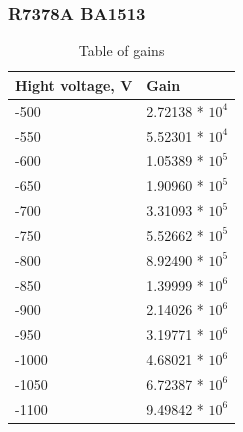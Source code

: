 \documentclass{beamer}
\begin{document}
\begin{frame}
\frametitle{R7378A BA1513}
\begin{table}
\begin{tabular}{l l}
\toprule
\textbf{Hight voltage, V} & \textbf{Gain} \\
\midrule
-500  &  2.72138 * $10^4$\\
-550  &  5.52301 * $10^4$\\
-600  &  1.05389 * $10^5$\\
-650  &  1.90960 * $10^5$\\
-700  &  3.31093 * $10^5$\\
-750  &  5.52662 * $10^5$\\
-800  &  8.92490 * $10^5$\\
-850  &  1.39999 * $10^6$\\
-900  &  2.14026 * $10^6$\\
-950  &  3.19771 * $10^6$\\
-1000 &  4.68021 * $10^6$\\
-1050 &  6.72387 * $10^6$\\
-1100 &  9.49842 * $10^6$\\
\bottomrule
\end{tabular}
\caption{Table of gains}
\end{table}
\end{frame}
\end{document}
